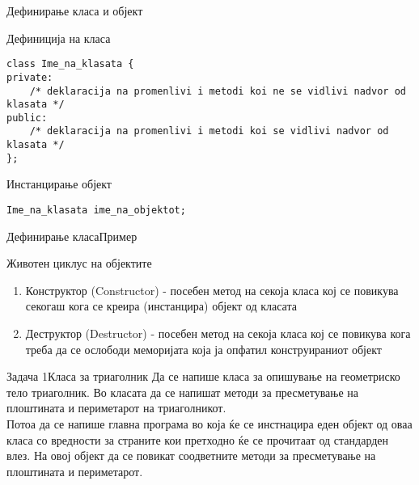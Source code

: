
\begin{frame}[fragile]{Дефинирање класа и објект}
\begin{exampleblock}{Дефиниција на класа}
\begin{lstlisting}
class Ime_na_klasata {
private:
    /* deklaracija na promenlivi i metodi koi ne se vidlivi nadvor od klasata */
public:
    /* deklaracija na promenlivi i metodi koi se vidlivi nadvor od klasata */
};
\end{lstlisting}
\end{exampleblock}
\begin{exampleblock}{Инстанцирање објект}
\begin{lstlisting}
Ime_na_klasata ime_na_objektot;
\end{lstlisting}
\end{exampleblock}
\end{frame}

\begin{frame}[fragile,shrink=10]{Дефинирање класа}{Пример}

\end{frame}

\begin{frame}{Животен циклус на објектите}
\begin{enumerate}
  \item Конструктор (Constructor) - посебен метод на секоја класа кој се
  повикува секогаш кога се креира (инстанцира) објект од класата
  \item Деструктор (Destructor) - посебен метод на секоја класа кој се
  повикува кога треба да се ослободи меморијата која ја опфатил конструираниот
  објект
\end{enumerate}
\end{frame}

\begin{frame}{Задача 1}{Класа за триаголник}
Да се напише класа за опишување на геометриско тело триаголник. Во класата да се
напишат методи за пресметување на плоштината и периметарот на триаголникот.\\
Потоа да се напише главна програма во која ќе се инстнацира еден објект од оваа
класа со вредности за страните кои претходно ќе се прочитаат од стандарден влез.
На овој објект да се повикат соодветните методи за пресметување на плоштината и
периметарот.
\end{frame}

